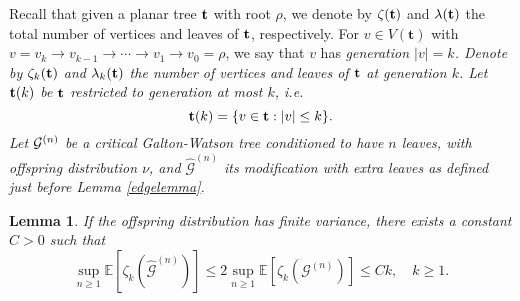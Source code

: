 \documentclass[11pt,a4paper]{article}
\newtheorem{lm}[prop]{Lemma}
\newcommand{\bE}{\mathbb{E}}
\newcommand{\cG}{\mathcal{G}}
\newcommand{\ft}{\mathbf{t}}
\begin{document}
Recall that given a planar tree ${\bf t}$ with root $\rho$, we denote by $\zeta({\bf t})$ and $\lambda({\bf t})$ the total number of vertices and leaves of ${\bf t}$, 
respectively. For $v\in V(\ft)$ with $v=v_k\rightarrow v_{k-1}\rightarrow\cdots\rightarrow v_1\rightarrow v_0=\rho$, we say that $v$ has \em generation \em $|v|=k$. 
Denote by $\zeta_k({\bf t})$ and $\lambda_k({\bf t})$ the number of vertices and leaves of ${\bf t}$ at generation $k$. Let ${\bf t}(k)$ be ${\bf t}$ restricted to
generation at most $k$, i.e.
$$
{\bf t}(k)=\{v\in {\bf t}: |v|\leq k\}.
$$
Let ${\cal G}^{(n)}$ be a critical Galton-Watson tree conditioned to have $n$ leaves, with offspring distribution $\nu$, and $\widehat{\cG}^{(n)}$ its modification with 
extra leaves as  defined just before Lemma \ref{edgelemma}.
\begin{lm}\label{bound} If the offspring distribution has finite variance, there exists a constant $C>0$ such that
$$\sup_{n\geq1}\bE\left[ \zeta_k\left(\widehat{{\mathcal G}}^{(n)}\right)\right]\leq 2\sup_{n\geq1}\bE\left[ \zeta_k\left({\mathcal G}^{(n)}\right)\right]\leq C k,\quad k\geq1.$$
\end{lm}
\end{document}
